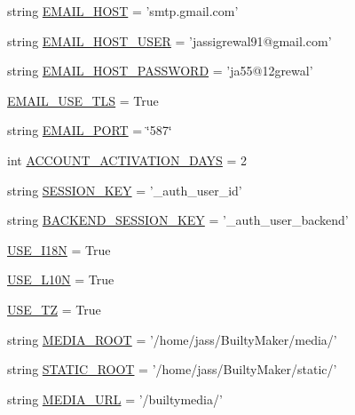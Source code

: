 \begin{DoxyCompactItemize}
string \hyperlink{namespaceBuiltyMaker_1_1settings_ac7229d3be25e7aec93c3e0ff55f24e94}{\-E\-M\-A\-I\-L\-\_\-\-H\-O\-S\-T} = 'smtp.\-gmail.\-com'
\item 
string \hyperlink{namespaceBuiltyMaker_1_1settings_ab122d3ae7ada4e2fbac00db859a25b34}{\-E\-M\-A\-I\-L\-\_\-\-H\-O\-S\-T\-\_\-\-U\-S\-E\-R} = 'jassigrewal91@gmail.\-com'
\item 
string \hyperlink{namespaceBuiltyMaker_1_1settings_a250e19c364a4971332678d16be2c9f87}{\-E\-M\-A\-I\-L\-\_\-\-H\-O\-S\-T\-\_\-\-P\-A\-S\-S\-W\-O\-R\-D} = 'ja55@12grewal'
\item 
\hyperlink{namespaceBuiltyMaker_1_1settings_a882fe92b777cea25285dd75a8d40c414}{\-E\-M\-A\-I\-L\-\_\-\-U\-S\-E\-\_\-\-T\-L\-S} = \-True
\item 
string \hyperlink{namespaceBuiltyMaker_1_1settings_a971295d138a0730971fb4bb26ba7b3f9}{\-E\-M\-A\-I\-L\-\_\-\-P\-O\-R\-T} = \char`\"{}587\char`\"{}
\item 
int \hyperlink{namespaceBuiltyMaker_1_1settings_a6632daa1567395072484c2b4c25f0d5e}{\-A\-C\-C\-O\-U\-N\-T\-\_\-\-A\-C\-T\-I\-V\-A\-T\-I\-O\-N\-\_\-\-D\-A\-Y\-S} = 2
\item 
string \hyperlink{namespaceBuiltyMaker_1_1settings_a03d35ed66cd756c1c96777ce53361a5f}{\-S\-E\-S\-S\-I\-O\-N\-\_\-\-K\-E\-Y} = '\-\_\-auth\-\_\-user\-\_\-id'
\item 
string \hyperlink{namespaceBuiltyMaker_1_1settings_a07b4f463c49027013b587b330de656b1}{\-B\-A\-C\-K\-E\-N\-D\-\_\-\-S\-E\-S\-S\-I\-O\-N\-\_\-\-K\-E\-Y} = '\-\_\-auth\-\_\-user\-\_\-backend'
\item 
\hyperlink{namespaceBuiltyMaker_1_1settings_a4429522ef11a37bbed0139cca908f495}{\-U\-S\-E\-\_\-\-I18\-N} = \-True
\item 
\hyperlink{namespaceBuiltyMaker_1_1settings_af231da09a788f480e9ccb9fbe616334d}{\-U\-S\-E\-\_\-\-L10\-N} = \-True
\item 
\hyperlink{namespaceBuiltyMaker_1_1settings_a6b42b0a0aee97937adc0b10700eb799b}{\-U\-S\-E\-\_\-\-T\-Z} = \-True
\item 
string \hyperlink{namespaceBuiltyMaker_1_1settings_ab380b04af8f9c17ed3d2f65949624c96}{\-M\-E\-D\-I\-A\-\_\-\-R\-O\-O\-T} = '/home/jass/\-Builty\-Maker/media/'
\item 
string \hyperlink{namespaceBuiltyMaker_1_1settings_a7d60f917627c15e4d6e3edb393b545e3}{\-S\-T\-A\-T\-I\-C\-\_\-\-R\-O\-O\-T} = '/home/jass/\-Builty\-Maker/static/'
\item 
string \hyperlink{namespaceBuiltyMaker_1_1settings_acd5a1424e561da3ec1b0610d987e1bb6}{\-M\-E\-D\-I\-A\-\_\-\-U\-R\-L} = '/builtymedia/'

\end{DoxyCompactItemize}
